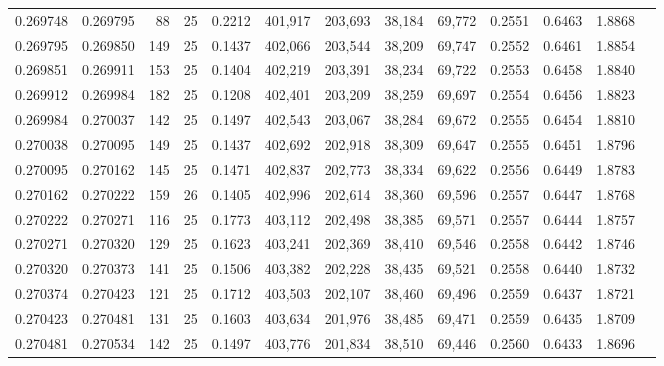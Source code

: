 \begin{tabular}{rrrrrrrrrrrrr}
0.269748 & 0.269795 &    88 &  25 &                                     0.2212 & 401,917 & 203,693 &  38,184 &  69,772 & 0.2551 & 0.6463 & 1.8868 \\
0.269795 & 0.269850 &   149 &  25 &                                     0.1437 & 402,066 & 203,544 &  38,209 &  69,747 & 0.2552 & 0.6461 & 1.8854 \\
0.269851 & 0.269911 &   153 &  25 &                                     0.1404 & 402,219 & 203,391 &  38,234 &  69,722 & 0.2553 & 0.6458 & 1.8840 \\
0.269912 & 0.269984 &   182 &  25 &                                     0.1208 & 402,401 & 203,209 &  38,259 &  69,697 & 0.2554 & 0.6456 & 1.8823 \\
0.269984 & 0.270037 &   142 &  25 &                                     0.1497 & 402,543 & 203,067 &  38,284 &  69,672 & 0.2555 & 0.6454 & 1.8810 \\
0.270038 & 0.270095 &   149 &  25 &                                     0.1437 & 402,692 & 202,918 &  38,309 &  69,647 & 0.2555 & 0.6451 & 1.8796 \\
0.270095 & 0.270162 &   145 &  25 &                                     0.1471 & 402,837 & 202,773 &  38,334 &  69,622 & 0.2556 & 0.6449 & 1.8783 \\
0.270162 & 0.270222 &   159 &  26 &                                     0.1405 & 402,996 & 202,614 &  38,360 &  69,596 & 0.2557 & 0.6447 & 1.8768 \\
0.270222 & 0.270271 &   116 &  25 &                                     0.1773 & 403,112 & 202,498 &  38,385 &  69,571 & 0.2557 & 0.6444 & 1.8757 \\
0.270271 & 0.270320 &   129 &  25 &                                     0.1623 & 403,241 & 202,369 &  38,410 &  69,546 & 0.2558 & 0.6442 & 1.8746 \\
0.270320 & 0.270373 &   141 &  25 &                                     0.1506 & 403,382 & 202,228 &  38,435 &  69,521 & 0.2558 & 0.6440 & 1.8732 \\
0.270374 & 0.270423 &   121 &  25 &                                     0.1712 & 403,503 & 202,107 &  38,460 &  69,496 & 0.2559 & 0.6437 & 1.8721 \\
0.270423 & 0.270481 &   131 &  25 &                                     0.1603 & 403,634 & 201,976 &  38,485 &  69,471 & 0.2559 & 0.6435 & 1.8709 \\
0.270481 & 0.270534 &   142 &  25 &                                     0.1497 & 403,776 & 201,834 &  38,510 &  69,446 & 0.2560 & 0.6433 & 1.8696 \\

\end{tabular}
